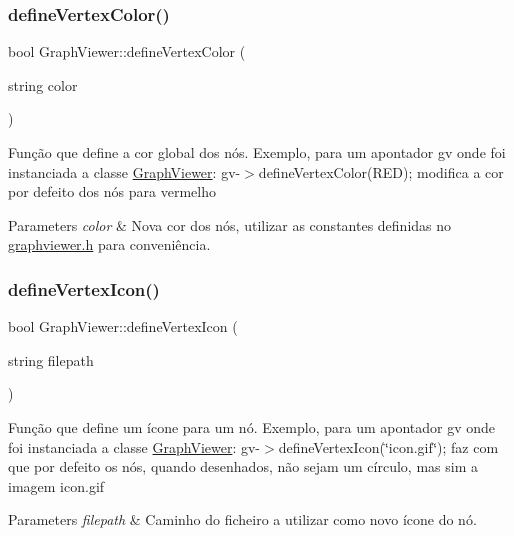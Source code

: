 \subsubsection{\texorpdfstring{defineVertexColor()}{defineVertexColor()}}
{\footnotesize\ttfamily bool Graph\+Viewer\+::define\+Vertex\+Color (\begin{DoxyParamCaption}\item[{string}]{color }\end{DoxyParamCaption})}

Função que define a cor global dos nós. Exemplo, para um apontador gv onde foi instanciada a classe \mbox{\hyperlink{class_graph_viewer}{Graph\+Viewer}}\+: gv-\/$>$define\+Vertex\+Color(\+R\+E\+D); modifica a cor por defeito dos nós para vermelho


\begin{DoxyParams}{Parameters}
{\em color} & Nova cor dos nós, utilizar as constantes definidas no \mbox{\hyperlink{graphviewer_8h_source}{graphviewer.\+h}} para conveniência. \\
\hline
\end{DoxyParams}
\mbox{\label{class_graph_viewer_af1adb6a361457187a820e01dcf0a34b7}} 
\subsubsection{\texorpdfstring{defineVertexIcon()}{defineVertexIcon()}}
{\footnotesize\ttfamily bool Graph\+Viewer\+::define\+Vertex\+Icon (\begin{DoxyParamCaption}\item[{string}]{filepath }\end{DoxyParamCaption})}

Função que define um ícone para um nó. Exemplo, para um apontador gv onde foi instanciada a classe \mbox{\hyperlink{class_graph_viewer}{Graph\+Viewer}}\+: gv-\/$>$define\+Vertex\+Icon(\char`\"{}icon.\+gif\char`\"{}); faz com que por defeito os nós, quando desenhados, não sejam um círculo, mas sim a imagem icon.\+gif


\begin{DoxyParams}{Parameters}
{\em filepath} & Caminho do ficheiro a utilizar como novo ícone do nó. \\
\hline
\end{DoxyParams}
\mbox{\label{class_graph_viewer_ac4b2a9fec74d38e64088aa79ca4b7d9b}} 
